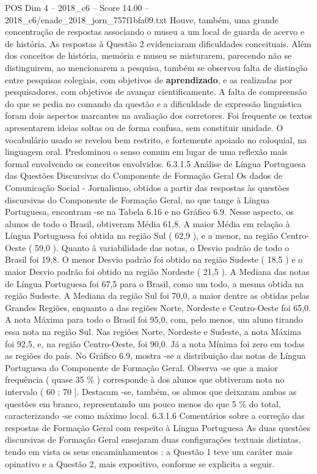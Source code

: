 \begin{textsample}{POS Dim 4 – 2018\_c6 – Score 14.00 – 2018\_c6/enade\_2018\_jorn\_757f1bfa09.txt}
Houve, também, uma grande concentração de respostas associando o museu a um local de guarda de acervo e de história.
As respostas à Questão 2 evidenciaram dificuldades conceituais.
Além dos conceitos de história, memória e museu se misturarem, parecendo não se distinguirem, ao mencionarem a pesquisa, também se observou falta de distinção entre pesquisas colegiais, com objetivos de \textbf{aprendizado}, e as realizadas por pesquisadores, com objetivos de avançar cientificamente.
A falta de compreensão do que se pedia no comando da questão e a dificuldade de expressão linguística foram dois aspectos marcantes na avaliação dos corretores.
Foi frequente os textos apresentarem ideias soltas ou de forma confusa, sem constituir unidade.
O vocabulário usado se revelou bem restrito, e fortemente apoiado no coloquial, na linguagem oral.
Predominou o senso comum em lugar de uma reflexão mais formal envolvendo os conceitos envolvidos. 6.3.1.5 Análise de Língua Portuguesa das Questões Discursivas do Componente de Formação Geral Os dados de Comunicação Social - Jornalismo, obtidos a partir das respostas às questões discursivas do Componente de Formação Geral, no que tange à Língua Portuguesa, encontram -se na Tabela 6.16 e no Gráfico 6.9.
Nesse aspecto, os alunos de todo o Brasil, obtiveram Média 61,8.
A maior Média em relação à Língua Portuguesa foi obtida na região Sul ( 62,9 ), e a menor, na região Centro-Oeste ( 59,0 ).
Quanto à variabilidade das notas, o Desvio padrão de todo o Brasil foi 19,8.
O menor Desvio padrão foi obtido na região Sudeste ( 18,5 ) e o maior Desvio padrão foi obtido na região Nordeste ( 21,5 ).
A Mediana das notas de Língua Portuguesa foi 67,5 para o Brasil, como um todo, a mesma obtida na região Sudeste.
A Mediana da região Sul foi 70,0, a maior dentre as obtidas pelas Grandes Regiões, enquanto a das regiões Norte, Nordeste e Centro-Oeste foi 65,0.
A nota Máxima para todo o Brasil foi 95,0, com, pelo menos, um aluno tirando essa nota na região Sul.
Nas regiões Norte, Nordeste e Sudeste, a nota Máxima foi 92,5, e, na região Centro-Oeste, foi 90,0.
Já a nota Mínima foi zero em todas as regiões do país.
No Gráfico 6.9, mostra -se a distribuição das notas de Língua Portuguesa do Componente de Formação Geral.
Observa -se que a maior frequência ( quase 35 \% ) corresponde à dos alunos que obtiveram nota no intervalo ( 60 ; 70 ].
Destacam -se, também, os alunos que deixaram ambas as questões em branco, representando um pouco menos do que 5 \% do total, caracterizando -se como máximo local. 6.3.1.6 Comentários sobre a correção das respostas de Formação Geral com respeito à Língua Portuguesa As duas questões discursivas de Formação Geral ensejaram duas configurações textuais distintas, tendo em vista os seus encaminhamentos : a Questão 1 teve um caráter mais opinativo e a Questão 2, mais expositivo, conforme se explicita a seguir.

\end{textsample}
